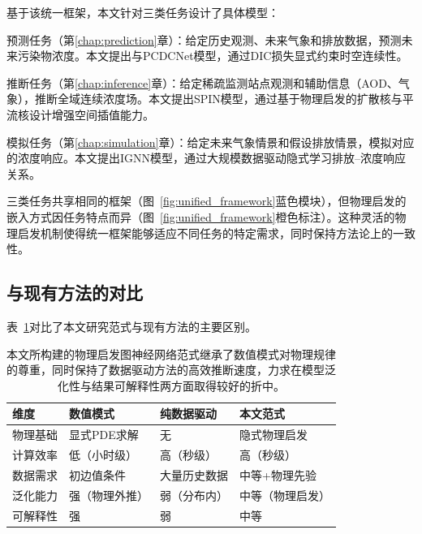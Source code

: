 基于该统一框架，本文针对三类任务设计了具体模型：

预测任务（第\ref{chap:prediction}章）：给定历史观测、未来气象和排放数据，预测未来污染物浓度。本文提出\ModelPred{}与PCDCNet模型，通过DIC损失显式约束时空连续性。

推断任务（第\ref{chap:inference}章）：给定稀疏监测站点观测和辅助信息（AOD、气象），推断全域连续浓度场。本文提出SPIN模型，通过基于物理启发的扩散核与平流核设计增强空间插值能力。

模拟任务（第\ref{chap:simulation}章）：给定未来气象情景和假设排放情景，模拟对应的浓度响应。本文提出IGNN模型，通过大规模数据驱动隐式学习排放--浓度响应关系。

三类任务共享相同的框架（图~\ref{fig:unified_framework}蓝色模块），但物理启发的嵌入方式因任务特点而异（图~\ref{fig:unified_framework}橙色标注）。这种灵活的物理启发机制使得统一框架能够适应不同任务的特定需求，同时保持方法论上的一致性。

\subsection{与现有方法的对比}
\label{subsec:comparison}

表~\ref{tab:paradigm_comparison}对比了本文研究范式与现有方法的主要区别。

\begin{table}[htbp]
    \centering
    \caption{本文研究范式与现有方法的对比}
    \caption*{本文所构建的物理启发图神经网络范式继承了数值模式对物理规律的尊重，同时保持了数据驱动方法的高效推断速度，力求在模型泛化性与结果可解释性两方面取得较好的折中。}
    \label{tab:paradigm_comparison}
    \begin{tabular}{@{}lp{2.8cm}p{2.8cm}p{3cm}@{}}
        \toprule
        \textbf{维度} & \textbf{数值模式} & \textbf{纯数据驱动} & \textbf{本文范式} \\
        \midrule
        物理基础 & 显式PDE求解 & 无 & 隐式物理启发 \\
        计算效率 & 低（小时级） & 高（秒级） & 高（秒级） \\
        数据需求 & 初边值条件 & 大量历史数据 & 中等+物理先验 \\
        泛化能力 & 强（物理外推） & 弱（分布内） & 中等（物理启发） \\
        可解释性 & 强 & 弱 & 中等 \\
        \bottomrule
    \end{tabular}
\end{table}

